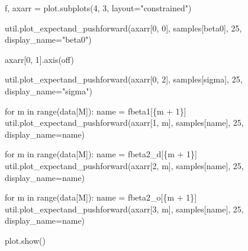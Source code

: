 \documentclass[
  letterpaper,
  DIV=11,
  numbers=noendperiod]{scrartcl}
\newenvironment{Shaded}{\begin{snugshade}}{\end{snugshade}}
\newcommand{\BuiltInTok}[1]{\textcolor[rgb]{0.00,0.23,0.31}{#1}}
\newcommand{\ControlFlowTok}[1]{\textcolor[rgb]{0.00,0.23,0.31}{#1}}
\newcommand{\DecValTok}[1]{\textcolor[rgb]{0.68,0.00,0.00}{#1}}
\newcommand{\KeywordTok}[1]{\textcolor[rgb]{0.00,0.23,0.31}{#1}}
\newcommand{\NormalTok}[1]{\textcolor[rgb]{0.00,0.23,0.31}{#1}}
\newcommand{\OperatorTok}[1]{\textcolor[rgb]{0.37,0.37,0.37}{#1}}
\newcommand{\SpecialCharTok}[1]{\textcolor[rgb]{0.37,0.37,0.37}{#1}}
\newcommand{\SpecialStringTok}[1]{\textcolor[rgb]{0.13,0.47,0.30}{#1}}
\newcommand{\StringTok}[1]{\textcolor[rgb]{0.13,0.47,0.30}{#1}}
\begin{document}
\begin{Shaded}
\begin{Highlighting}[]
\NormalTok{f, axarr }\OperatorTok{=}\NormalTok{ plot.subplots(}\DecValTok{4}\NormalTok{, }\DecValTok{3}\NormalTok{, layout}\OperatorTok{=}\StringTok{"constrained"}\NormalTok{)}

\NormalTok{util.plot\_expectand\_pushforward(axarr[}\DecValTok{0}\NormalTok{, }\DecValTok{0}\NormalTok{], samples[}\StringTok{\textquotesingle{}beta0\textquotesingle{}}\NormalTok{],}
                                \DecValTok{25}\NormalTok{, display\_name}\OperatorTok{=}\StringTok{"beta0"}\NormalTok{)}

\NormalTok{axarr[}\DecValTok{0}\NormalTok{, }\DecValTok{1}\NormalTok{].axis(}\StringTok{\textquotesingle{}off\textquotesingle{}}\NormalTok{)}

\NormalTok{util.plot\_expectand\_pushforward(axarr[}\DecValTok{0}\NormalTok{, }\DecValTok{2}\NormalTok{], samples[}\StringTok{\textquotesingle{}sigma\textquotesingle{}}\NormalTok{],}
                                \DecValTok{25}\NormalTok{, display\_name}\OperatorTok{=}\StringTok{"sigma"}\NormalTok{)}

\ControlFlowTok{for}\NormalTok{ m }\KeywordTok{in} \BuiltInTok{range}\NormalTok{(data[}\StringTok{\textquotesingle{}M\textquotesingle{}}\NormalTok{]):}
\NormalTok{  name }\OperatorTok{=} \SpecialStringTok{f\textquotesingle{}beta1[}\SpecialCharTok{\{}\NormalTok{m }\OperatorTok{+} \DecValTok{1}\SpecialCharTok{\}}\SpecialStringTok{]\textquotesingle{}}
\NormalTok{  util.plot\_expectand\_pushforward(axarr[}\DecValTok{1}\NormalTok{, m], samples[name],}
                                  \DecValTok{25}\NormalTok{, display\_name}\OperatorTok{=}\NormalTok{name)}

\ControlFlowTok{for}\NormalTok{ m }\KeywordTok{in} \BuiltInTok{range}\NormalTok{(data[}\StringTok{\textquotesingle{}M\textquotesingle{}}\NormalTok{]):}
\NormalTok{  name }\OperatorTok{=} \SpecialStringTok{f\textquotesingle{}beta2\_d[}\SpecialCharTok{\{}\NormalTok{m }\OperatorTok{+} \DecValTok{1}\SpecialCharTok{\}}\SpecialStringTok{]\textquotesingle{}}
\NormalTok{  util.plot\_expectand\_pushforward(axarr[}\DecValTok{2}\NormalTok{, m], samples[name],}
                                  \DecValTok{25}\NormalTok{, display\_name}\OperatorTok{=}\NormalTok{name)}

\ControlFlowTok{for}\NormalTok{ m }\KeywordTok{in} \BuiltInTok{range}\NormalTok{(data[}\StringTok{\textquotesingle{}M\textquotesingle{}}\NormalTok{]):}
\NormalTok{  name }\OperatorTok{=} \SpecialStringTok{f\textquotesingle{}beta2\_o[}\SpecialCharTok{\{}\NormalTok{m }\OperatorTok{+} \DecValTok{1}\SpecialCharTok{\}}\SpecialStringTok{]\textquotesingle{}}
\NormalTok{  util.plot\_expectand\_pushforward(axarr[}\DecValTok{3}\NormalTok{, m], samples[name],}
                                  \DecValTok{25}\NormalTok{, display\_name}\OperatorTok{=}\NormalTok{name)}

\NormalTok{plot.show()}
\end{Highlighting}
\end{Shaded}
\end{document}
